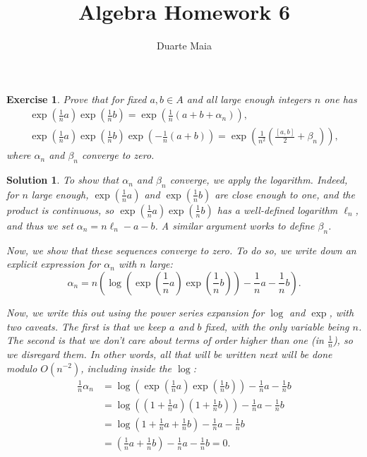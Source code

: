 \documentclass{article}
\title{Algebra Homework 6}
\author{Duarte Maia}
\newtheorem{ex}{Exercise}
\theoremstyle{nonumberplain}
\newtheorem{sol}{Solution}
\begin{document}
\maketitle

\begin{ex}
Prove that for fixed $a, b \in A$ and all large enough integers $n$ one has
\begin{gather}
\exp(\frac1n a) \exp(\frac1n b) = \exp(\frac1n(a + b + \alpha_n)),\\
\exp(\frac1n a) \exp(\frac1n b) \exp(-\frac1n(a+b)) = \exp(\frac1{n^2} (\frac{[a,b]}2 + \beta_n)),
\end{gather}
where $\alpha_n$ and $\beta_n$ converge to zero.
\end{ex}

\begin{sol}
To show that $\alpha_n$ and $\beta_n$ converge, we apply the logarithm. Indeed, for $n$ large enough, $\exp(\frac1n a)$ and $\exp(\frac1n b)$ are close enough to one, and the product is continuous, so $\exp(\frac1n a) \exp(\frac1n b)$ has a well-defined logarithm $\ell_n$, and thus we set $\alpha_n = n \ell_n - a - b$. A similar argument works to define $\beta_n$.

Now, we show that these sequences converge to zero. To do so, we write down an explicit expression for $\alpha_n$ with $n$ large:
\begin{equation}
\alpha_n = n \left( \log(\exp(\frac1n a) \exp(\frac1n b)) - \frac1n a - \frac1n b \right).
\end{equation}

Now, we write this out using the power series expansion for $\log$ and $\exp$, with two caveats. The first is that we keep $a$ and $b$ fixed, with the only variable being $n$. The second is that we don't care about terms of order higher than one (in $\frac1n$), so we disregard them. In other words, all that will be written next will be done modulo $O(n^{-2})$, including inside the $\log$:
\begin{equation}
\begin{aligned}
\frac1n \alpha_n &= \log(\exp(\frac1n a) \exp(\frac1n b)) - \frac1n a - \frac1n b\\
&= \log\left( \left(1 + \frac1n a \right) \left(1 + \frac1n b \right) \right) - \frac1n a - \frac1n b\\
&= \log \left(1 + \frac1n a + \frac1n b \right) - \frac1n a - \frac1n b \\
&= \left( \frac1n a + \frac1n b\right) - \frac1n a - \frac1n b = 0.
\end{aligned}
\end{equation}


\end{sol}
\end{document}
